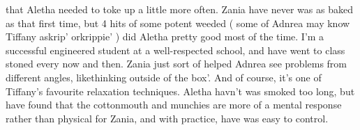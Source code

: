 \documentclass[12pt]{book}
\begin{document}
that Aletha needed to toke up a little more often. Zania have never was as baked as that first time, but 4 hits of some potent weeded ( some of Adnrea may know Tiffany askrip' orkrippie' ) did Aletha pretty good most of the time. I'm a successful engineered student at a well-respected school, and have went to class stoned every now and then. Zania just sort of helped Adnrea see problems from different angles, likethinking outside of the box'. And of course, it's one of Tiffany's favourite relaxation techniques. Aletha havn't was smoked too long, but have found that the cottonmouth and munchies are more of a mental response rather than physical for Zania, and with practice, have was easy to control.
\end{document}
